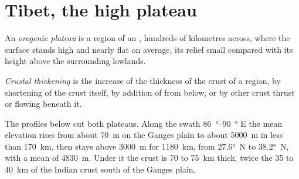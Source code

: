 \section{Tibet, the high plateau}\label{sec:b2:himalaya-andes:tibet}

\begin{definition}\label{def:b2:himalaya-andes:plateau}
An \emph{orogenic plateau} is a region of an , hundreds of
kilometres across, where the surface stands high and nearly flat on average, its relief
small compared with its height above the surrounding lowlands.
\end{definition}

\begin{definition}\label{def:b2:himalaya-andes:thickening}
\emph{Crustal thickening} is the increase of the thickness of the
crust of a region, by shortening of the crust itself, by addition of  from below, or by
other crust thrust or flowing beneath it.
\end{definition}

The profiles below cut both plateaus. Along the swath \qtyrange{86}{90}{\degree} E the mean
elevation rises from about \qty{70}{m} on the Ganges plain to about \qty{5000}{m} in less
than \qty{170}{km}, then stays above \qty{3000}{m} for \qty{1180}{km}, from \ang{27.6}~N to
\ang{38.2}~N, with a mean of \qty{4830}{m}. Under it the crust is 70 to \qty{75}{km} thick,
twice the 35 to \qty{40}{km} of the Indian crust south of the Ganges plain.

